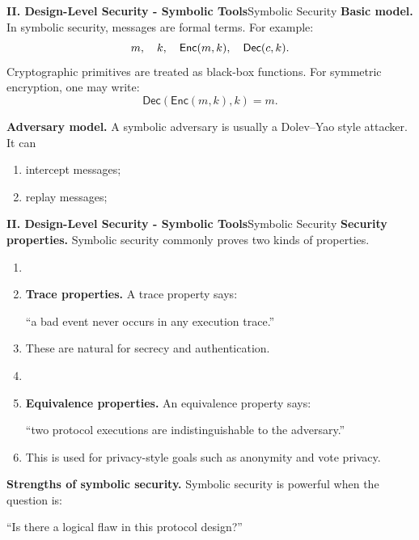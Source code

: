\documentclass[10pt,aspectratio=1610,compress,dvipsnames]{beamer}
\begin{document}
\begin{frame}[fragile]{\bfseries II. Design-Level Security - Symbolic Tools}{Symbolic Security}
\textbf{Basic model.}\; In symbolic security, messages are formal terms. For example: \[
m,\quad k,\quad \mathsf{Enc}(m,k),\quad\mathsf{Dec}(c,k).
\] Cryptographic primitives are treated as \colorbox{-blue}{black-box functions}. For symmetric encryption, one may write:
\[
\mathsf{Dec}(\mathsf{Enc}(m,k),k)=m.
\]

\medskip

\noindent
\textbf{Adversary model.}\; A symbolic adversary is usually a Dolev--Yao style attacker. It can \begin{enumerate}[$\bullet$]
	\item intercept messages;
	\item replay messages;
\end{enumerate}
\end{frame}

\begin{frame}[fragile]{\bfseries II. Design-Level Security - Symbolic Tools}{Symbolic Security}
	\textbf{Security properties.}\; Symbolic security commonly proves two kinds of properties.
	
	\begin{enumerate}[(1)]
		\item[]
		\item \colorbox{-blue}{\textbf{Trace properties.}}\; A trace property says: \begin{center}
			``a bad event never occurs in any execution trace.''
		\end{center}
		\item[$\to$] These are natural for secrecy and authentication.
		\item[]
		\item \colorbox{-blue}{\textbf{Equivalence properties.}}\; An equivalence property says: \begin{center}
			``two protocol executions are indistinguishable to the adversary.''
		\end{center}
		\item[$\to$] This is used for privacy-style goals such as anonymity and vote privacy. 
	\end{enumerate}

	\vfill
	
	\noindent\textbf{Strengths of symbolic security.} Symbolic security is powerful when the question is:
	\begin{center}
	``Is there a logical flaw in this protocol design?''
	\end{center}
\end{frame}
\end{document}
